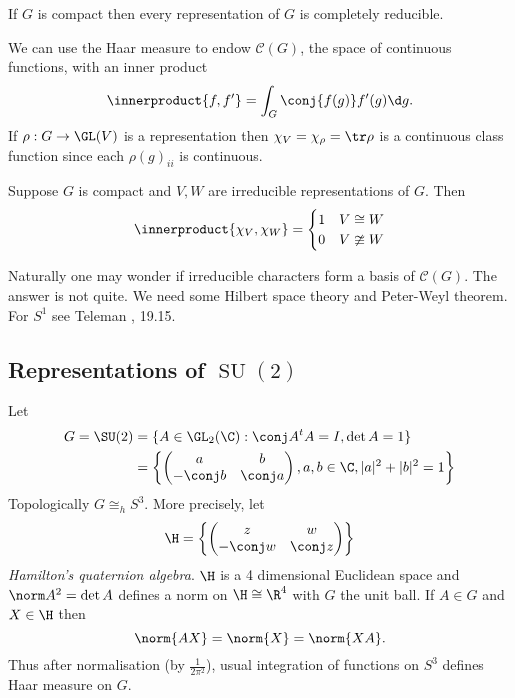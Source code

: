 \documentclass[a4paper]{article}
\newcommand*{\ip}{\innerproduct} %
\theoremstyle{definition}
\begin{document}
\begin{corollary}[Maschke]
  If \(G\) is compact then every representation of \(G\) is completely reducible.
\end{corollary}

We can use the Haar measure to endow \(\mathcal C(G)\), the space of continuous functions, with an inner product
\[
  \ip{f, f'} = \int_G \conj{f(g)} f'(g) \d g.
\]
If \(\rho: G \to \GL(V)\) is a representation then \(\chi_V = \chi_\rho = \tr \rho\) is a continuous class function since each \(\rho(g)_{ii}\) is continuous.

\begin{theorem}
  Suppose \(G\) is compact and \(V, W\) are irreducible representations of \(G\). Then
  \[
    \ip{\chi_V, \chi_W} =
    \begin{cases}
      1 & V \cong W \\
      0 & V \ncong W
    \end{cases}
  \]
\end{theorem}
Naturally one may wonder if irreducible characters form a basis of \(\mathcal C(G)\). The answer is not quite. We need some Hilbert space theory and Peter-Weyl theorem. For \(S^1\) see Teleman , 19.15.

\subsection{Representations of \(\operatorname{SU}(2)\)}

Let
\begin{align*}
  G = \SU(2)
  &= \{A \in \GL_2(\C): \conj A^t A = I, \det A = 1\} \\
  &= \left\{
    \begin{pmatrix}
      a & b \\
      - \conj b & \conj a
    \end{pmatrix},
                  a, b \in \C, |a|^2 + |b|^2 = 1\right\}
\end{align*}
Topologically \(G \cong_h S^3\). More precisely, let
\[
  \H = \left\{
    \begin{pmatrix}
      z & w \\
      -\conj w & \conj z
    \end{pmatrix}
  \right\}
\]
\emph{Hamilton's quaternion algebra}. \(\H\) is a 4 dimensional Euclidean space and \(\norm A^2 = \det A\) defines a norm on \(\H \cong \R^4\) with \(G\) the unit ball. If \(A \in G\) and \(X \in \H\) then
\[
  \norm{AX} = \norm{X} = \norm{XA}.
\]
Thus after normalisation (by \(\frac{1}{2\pi^2}\)), usual integration of functions on \(S^3\) defines Haar measure on \(G\).
\end{document}
